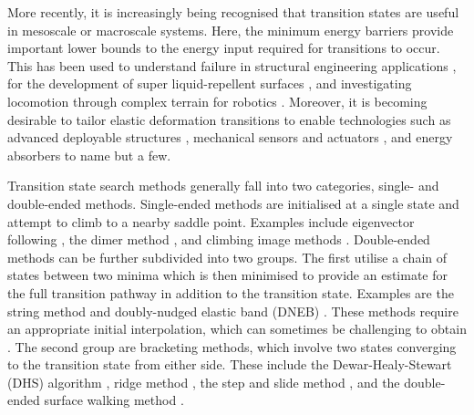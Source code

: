 \documentclass[aip,jcp,reprint,twocolumn]{revtex4-1}
\begin{document}
More recently, it is increasingly being recognised that transition states are useful in mesoscale or macroscale systems.
Here, the minimum energy barriers provide important lower bounds to the energy input required for transitions to occur.
This has been used to understand failure in structural engineering applications \cite{Panter2019,Hutchinson2018}, for the development of super liquid-repellent surfaces \cite{Zhang2014,Panter2019b,Amabili2017}, and investigating locomotion through complex terrain for robotics \cite{Othayoth2020}.
Moreover, it is becoming desirable to tailor elastic deformation transitions to enable technologies such as advanced deployable structures \cite{Filipov2015,Zhai2018}, mechanical sensors and actuators \cite{Bertoldi2017,Truby2016,Chi2022,Bonfanti2020}, and energy absorbers \cite{Shan2015,Giri2021} to name but a few.

Transition state search methods generally fall into two categories, single- and double-ended methods.
Single-ended methods are initialised at a single state and attempt to climb to a nearby saddle point.
Examples include eigenvector following \cite{Cerjan1981}, the dimer method \cite{Heyden2005,Kastner2008,Zhang2016}, and climbing image methods \cite{E2007,Ren2013}.
Double-ended methods can be further subdivided into two groups.
The first utilise a chain of states between two minima which is then minimised to provide an estimate for the full transition pathway in addition to the transition state.
Examples are the string method \cite{E2002,E2007} and doubly-nudged elastic band (DNEB) \cite{Trygubenko2004}.
These methods require an appropriate initial interpolation, which can sometimes be challenging to obtain \cite{Wales2012a}.
The second group are bracketing methods, which involve two states converging to the transition state from either side.
These include the Dewar-Healy-Stewart (DHS) algorithm \cite{Dewar1984}, ridge method \cite{Ionova1993}, the step and slide method \cite{Miron2001}, and the double-ended surface walking method \cite{Zhang2013}.
\end{document}
